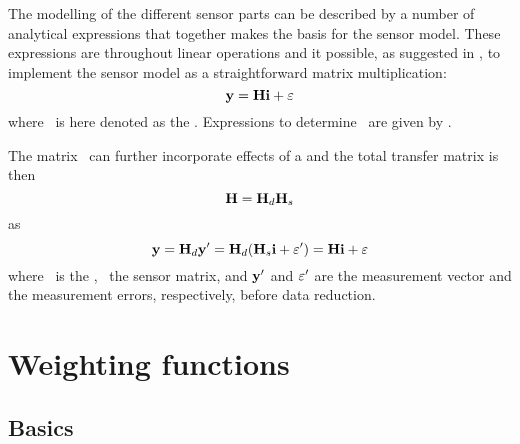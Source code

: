  The modelling of the different sensor parts can be described by a number of
 analytical expressions that together makes the basis for the sensor model.
 These expressions are throughout linear operations and it possible, as
 suggested in \citet{eriksson:00a}, to implement the sensor model as a
 straightforward matrix multiplication:
 \begin{equation}
   \mathbf{y} = \mathbf{H} \mathbf{i} + \varepsilon
  \label{eq:formalism:H}
 \end{equation}
 where \SnsMtr\ is here denoted as the . 
 Expressions to determine \SnsMtr\ are given by \citet{eriksson:06}.

 The matrix \SnsMtr\ can further incorporate effects of a
  and the total transfer matrix is then
 \begin{equation}
   \mathbf{H} = \mathbf{H}_{d} \mathbf{H}_{s}
  \label{eq:formalism:Hs}
 \end{equation}
 as
 \begin{equation}
   \mathbf{y} = \mathbf{H}_{d} \mathbf{y}' = \mathbf{H}_{d} (\mathbf{H}_{s} \mathbf{i} + 
                                    \varepsilon') = \mathbf{H} \mathbf{i} + \varepsilon
  \label{eq:formalism:datared}
 \end{equation}
 where \ is the ,
 \ the sensor matrix, and $\mathbf{y}'$ and $\varepsilon'$ are
 the measurement vector and the measurement errors, respectively,
 before data reduction.



\section{Weighting functions} 
 \label{sec:formalism:wfuns}
 
 \subsection{Basics} 
 
